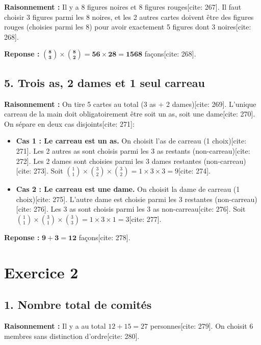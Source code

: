 \documentclass[11pt,a4paper]{article}
\begin{document}
\textbf{Raisonnement :} Il y a 8 figures noires et 8 figures rouges[cite: 267]. Il faut choisir 3 figures parmi les 8 noires, et les 2 autres cartes doivent être des figures rouges (choisies parmi les 8) pour avoir exactement 5 figures dont 3 noires[cite: 268].

\textbf{Reponse :} $\mathbf{\binom{8}{3} \times \binom{8}{2} = 56 \times 28 = 1568}$ façons[cite: 268].

\subsection*{5. Trois as, 2 dames et 1 seul carreau}

\textbf{Raisonnement :} On tire 5 cartes au total (3 as + 2 dames)[cite: 269]. L'unique carreau de la main doit obligatoirement être soit un as, soit une dame[cite: 270]. On sépare en deux cas disjoints[cite: 271]:
\begin{itemize}
    \item \textbf{Cas 1 : Le carreau est un as.} On choisit l'as de carreau (1 choix)[cite: 271]. Les 2 autres as sont choisis parmi les 3 as restants (non-carreau)[cite: 272]. Les 2 dames sont choisies parmi les 3 dames restantes (non-carreau)[cite: 273]. Soit $\binom{1}{1} \times \binom{3}{2} \times \binom{3}{2} = 1 \times 3 \times 3 = 9$[cite: 274].
    \item \textbf{Cas 2 : Le carreau est une dame.} On choisit la dame de carreau (1 choix)[cite: 275]. L'autre dame est choisie parmi les 3 restantes (non-carreau)[cite: 276]. Les 3 as sont choisis parmi les 3 as non-carreau[cite: 276]. Soit $\binom{1}{1} \times \binom{3}{1} \times \binom{3}{3} = 1 \times 3 \times 1 = 3$[cite: 277].
\end{itemize}

\textbf{Reponse :} $\mathbf{9 + 3 = 12}$ façons[cite: 278].

\hrulefill

\section*{Exercice 2}

\subsection*{1. Nombre total de comités}

\textbf{Raisonnement :} Il y a au total $12 + 15 = 27$ personnes[cite: 279]. On choisit 6 membres sans distinction d'ordre[cite: 280].
\end{document}
